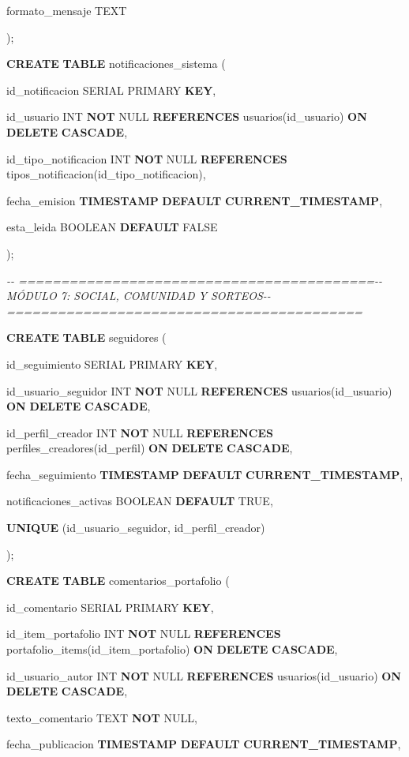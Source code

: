 \documentclass[
]{article}
\begin{document}
formato\_mensaje TEXT

);

\textbf{CREATE} \textbf{TABLE} notificaciones\_sistema (

id\_notificacion SERIAL PRIMARY \textbf{KEY},

id\_usuario INT \textbf{NOT} NULL \textbf{REFERENCES}
usuarios(id\_usuario) \textbf{ON} \textbf{DELETE} \textbf{CASCADE},

id\_tipo\_notificacion INT \textbf{NOT} NULL \textbf{REFERENCES}
tipos\_notificacion(id\_tipo\_notificacion),

fecha\_emision \textbf{TIMESTAMP} \textbf{DEFAULT}
\textbf{CURRENT\_TIMESTAMP},

esta\_leida BOOLEAN \textbf{DEFAULT} FALSE

);

\emph{-\/- ==========================================-\/- MÓDULO 7:
SOCIAL, COMUNIDAD Y SORTEOS-\/-
==========================================}

\textbf{CREATE} \textbf{TABLE} seguidores (

id\_seguimiento SERIAL PRIMARY \textbf{KEY},

id\_usuario\_seguidor INT \textbf{NOT} NULL \textbf{REFERENCES}
usuarios(id\_usuario) \textbf{ON} \textbf{DELETE} \textbf{CASCADE},

id\_perfil\_creador INT \textbf{NOT} NULL \textbf{REFERENCES}
perfiles\_creadores(id\_perfil) \textbf{ON} \textbf{DELETE}
\textbf{CASCADE},

fecha\_seguimiento \textbf{TIMESTAMP} \textbf{DEFAULT}
\textbf{CURRENT\_TIMESTAMP},

notificaciones\_activas BOOLEAN \textbf{DEFAULT} TRUE,

\textbf{UNIQUE} (id\_usuario\_seguidor, id\_perfil\_creador)

);

\textbf{CREATE} \textbf{TABLE} comentarios\_portafolio (

id\_comentario SERIAL PRIMARY \textbf{KEY},

id\_item\_portafolio INT \textbf{NOT} NULL \textbf{REFERENCES}
portafolio\_items(id\_item\_portafolio) \textbf{ON} \textbf{DELETE}
\textbf{CASCADE},

id\_usuario\_autor INT \textbf{NOT} NULL \textbf{REFERENCES}
usuarios(id\_usuario) \textbf{ON} \textbf{DELETE} \textbf{CASCADE},

texto\_comentario TEXT \textbf{NOT} NULL,

fecha\_publicacion \textbf{TIMESTAMP} \textbf{DEFAULT}
\textbf{CURRENT\_TIMESTAMP},
\end{document}
